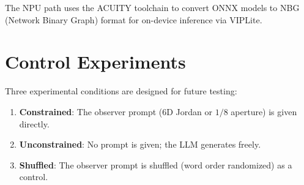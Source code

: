 \documentclass[11pt]{article}
\begin{document}
The NPU path uses the ACUITY toolchain to convert ONNX models to NBG (Network Binary Graph) format for on-device inference via VIPLite.

\section{Control Experiments}

Three experimental conditions are designed for future testing:

\begin{enumerate}
\item \textbf{Constrained}: The observer prompt (6D Jordan or $1/8$ aperture) is given directly.
\item \textbf{Unconstrained}: No prompt is given; the LLM generates freely.
\item \textbf{Shuffled}: The observer prompt is shuffled (word order randomized) as a control.
\end{enumerate}
\end{document}
